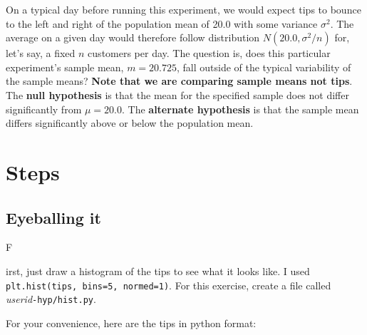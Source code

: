 \documentclass[titlepage]{tufte-book}
\newcounter{problem}
\newcommand{\step}[1]{{}
\vspace{4pt} \noindent {\bf \theproblem. }#1\addtocounter{problem}{1}}
\begin{document}
\begin{fullwidth}
On a typical day before running this experiment, we would expect tips to bounce  to the left and right of the population mean of 20.0 with some variance $\sigma^2$. The average on a given day would therefore follow distribution $N(20.0, \sigma^2/n)$ for, let's say, a fixed $n$ customers per day. The question is, does this particular  experiment's sample mean, $m=20.725$, fall outside of the typical variability of the sample means? {\bf Note that we are comparing sample means not tips}. The {\bf null hypothesis} is that the mean for the specified sample does not differ significantly from $\mu = 20.0$.   The {\bf alternate hypothesis} is that the sample mean differs significantly above or below the population mean.  

\section{Steps}

\subsection{Eyeballing it}

\step First, just draw a histogram of the tips to see what it looks like. I used {\tt plt.hist(tips, bins=5, normed=1)}. For this exercise, create a file called {\em userid}{\tt -hyp/hist.py}.


\noindent For your convenience, here are the tips in python format:


\end{fullwidth}
\end{document}
